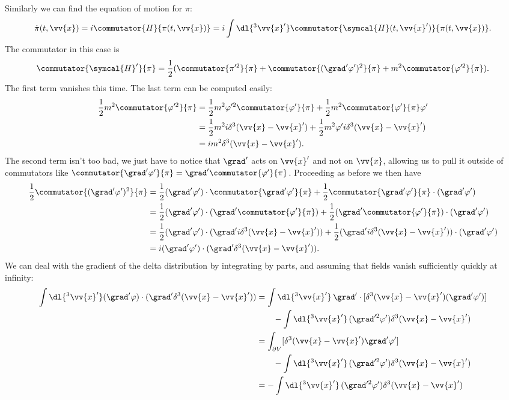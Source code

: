 \documentclass[fleqn]{NotesClass}
\newcommand{\hamiltonianDensity}{\symcal{H}}
\begin{document}
    Similarly we can find the equation of motion for \(\pi\):
    \begin{equation}
        \dot{\pi}(t, \vv{x}) = i\commutator{H}{\pi(t, \vv{x})} = i\int \dl{^3\vv{x}'} \commutator{\hamiltonianDensity(t, \vv{x}')}{\pi(t, \vv{x})}.
    \end{equation}
    The commutator in this case is
    \begin{equation}
        \commutator{\hamiltonianDensity'}{\pi} = \frac{1}{2}(\commutator{\pi'^2}{\pi} + \commutator{(\grad'\varphi')^2}{\pi} + m^2\commutator{\varphi'^2}{\pi}).
    \end{equation}
    The first term vanishes this time.
    The last term can be computed easily:
    \begin{align}
        \frac{1}{2}m^2\commutator{\varphi'^2}{\pi} &= \frac{1}{2}m^2 \varphi'^2\commutator{\varphi'}{\pi} + \frac{1}{2}m^2\commutator{\varphi'}{\pi}\varphi'\\
        &= \frac{1}{2}m^2 i\delta^3(\vv{x} - \vv{x}') + \frac{1}{2}m^2 \varphi' i\delta^3(\vv{x} - \vv{x}')\\
        &= im^2 \delta^3(\vv{x} - \vv{x}').
    \end{align}
    The second term isn't too bad, we just have to notice that \(\grad'\) acts on \(\vv{x}'\) and not on \(\vv{x}\), allowing us to pull it outside of commutators like \(\commutator{\grad'\varphi'}{\pi} = \grad'\commutator{\varphi'}{\pi}\).
    Proceeding as before we then have
    \begin{align}
        \frac{1}{2}\commutator{(\grad'\varphi')^2}{\pi} &= \frac{1}{2} (\grad'\varphi') \cdot \commutator{\grad'\varphi'}{\pi} + \frac{1}{2} \commutator{\grad'\varphi'}{\pi} \cdot (\grad'\varphi')\\
        &= \frac{1}{2}(\grad'\varphi') \cdot (\grad'\commutator{\varphi'}{\pi}) + \frac{1}{2}(\grad'\commutator{\varphi'}{\pi}) \cdot (\grad'\varphi')\\
        &= \frac{1}{2}(\grad'\varphi') \cdot (\grad'i\delta^3(\vv{x} - \vv{x}')) + \frac{1}{2}(\grad'i\delta^3(\vv{x} - \vv{x}')) \cdot (\grad'\varphi')\notag\\
        &= i(\grad'\varphi') \cdot (\grad'\delta^3(\vv{x} - \vv{x}')).
    \end{align}
    We can deal with the gradient of the delta distribution by integrating by parts, and assuming that fields vanish sufficiently quickly at infinity:
    \begin{align}
        \int \dl{^3\vv{x}'} (\grad'\varphi) \cdot (\grad'\delta^3(\vv{x} - \vv{x}')) &= \int \dl{^3\vv{x}'} \, \grad' \cdot [\delta^3(\vv{x} - \vv{x}') (\grad'\varphi')]\\
        &\qquad- \int \dl{^3\vv{x}'} \, (\grad'^2\varphi') \delta^3(\vv{x} - \vv{x}')\\
        &= \int_{\partial V} [\delta^3(\vv{x} - \vv{x}') \grad'\varphi']\\
        &\qquad- \int \dl{^3\vv{x}'} \, (\grad'^2\varphi') \delta^3(\vv{x} - \vv{x}')\\
        &= - \int \dl{^3\vv{x}'} \, (\grad'^2\varphi') \delta^3(\vv{x} - \vv{x}')
    \end{align}
\end{document}
